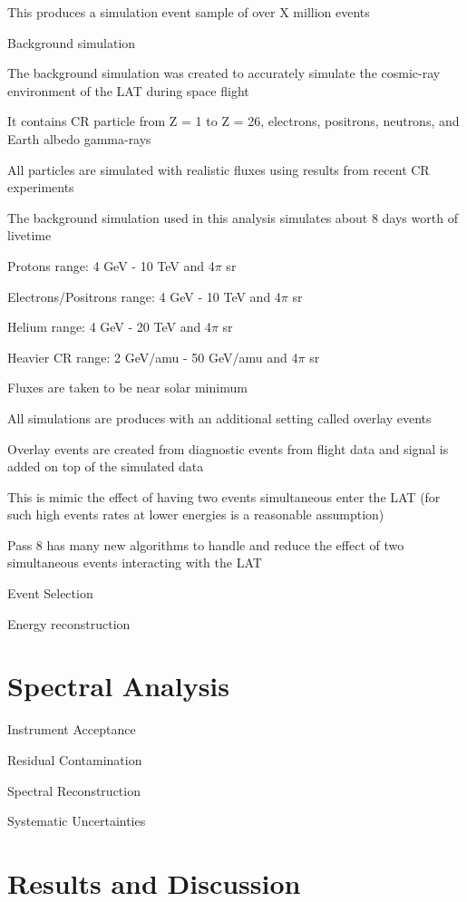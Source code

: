 \documentclass{article}
\begin{document}
\begin{myEnumerate}
\begin{myEnumerate}
\begin{myEnumerate}
					\item This produces a simulation event sample of over X million events
				\end{myEnumerate}
				\item Background simulation 
				\begin{myEnumerate}
					\item The background simulation was created to accurately simulate the cosmic-ray environment of the LAT during space flight
					\item It contains CR particle from Z = 1 to Z = 26, electrons, positrons, neutrons, and Earth albedo gamma-rays
					\item All particles are simulated with realistic fluxes using results from recent CR experiments
					\item The background simulation used in this analysis simulates about 8 days worth of livetime 
					\item Protons range: 4 GeV - 10 TeV and 4$\pi$ sr
					\item Electrons/Positrons range: 4 GeV - 10 TeV and 4$\pi$ sr
					\item Helium range: 4 GeV - 20 TeV and 4$\pi$ sr
					\item Heavier CR range: 2 GeV/amu - 50 GeV/amu and 4$\pi$ sr
					\item Fluxes are taken to be near solar minimum
				\end{myEnumerate}
				\item All simulations are produces with an additional setting called overlay events
				\begin{myEnumerate}
					\item Overlay events are created from diagnostic events from flight data and signal is added on top of the simulated data
					\item This is mimic the effect of having two events simultaneous enter the LAT (for such high events rates at lower energies is a reasonable assumption)
					\item Pass 8 has many new algorithms to handle and reduce the effect of two simultaneous events interacting with the LAT
				\end{myEnumerate}

			\end{myEnumerate}
		\item Event Selection
		\item Energy reconstruction
	\end{myEnumerate}

\section{Spectral Analysis}
	\begin{myEnumerate}
		\item Instrument Acceptance
		\item Residual Contamination
		\item Spectral Reconstruction
		\item Systematic Uncertainties
	\end{myEnumerate}
\section{Results and Discussion}
\end{document}

